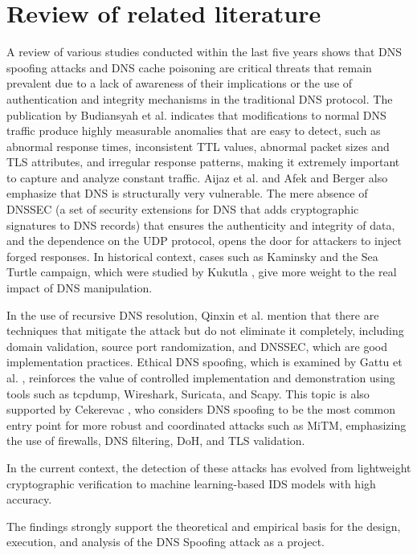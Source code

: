 \documentclass[conference]{IEEEtran}
\begin{document}
\section{Review of related literature}
A review of various studies conducted within the last five years shows that DNS spoofing attacks and DNS cache poisoning are critical threats that remain prevalent due to a lack of awareness of their implications or the use of authentication and integrity mechanisms in the traditional DNS protocol. The publication by Budiansyah et al. \cite{b1} indicates that modifications to normal DNS traffic produce highly measurable anomalies that are easy to detect, such as abnormal response times, inconsistent TTL values, abnormal packet sizes and TLS attributes, and irregular response patterns, making it extremely important to capture and analyze constant traffic. Aijaz et al. \cite{b2} and Afek and Berger \cite{b3} also emphasize that DNS is structurally very vulnerable. The mere absence of DNSSEC (a set of security extensions for DNS that adds cryptographic signatures to DNS records) that ensures the authenticity and integrity of data, and the dependence on the UDP protocol, opens the door for attackers to inject forged responses. In historical context, cases such as Kaminsky and the Sea Turtle campaign, which were studied by Kukutla \cite{b4}, give more weight to the real impact of DNS manipulation.

In the use of recursive DNS resolution, Qinxin et al. \cite{b5} mention that there are techniques that mitigate the attack but do not eliminate it completely, including domain validation, source port randomization, and DNSSEC, which are good implementation practices. Ethical DNS spoofing, which is examined by Gattu et al. \cite{b6}, reinforces the value of controlled implementation and demonstration using tools such as tcpdump, Wireshark, Suricata, and Scapy. This topic is also supported by Cekerevac \cite{b7}, who considers DNS spoofing to be the most common entry point for more robust and coordinated attacks such as MiTM, emphasizing the use of firewalls, DNS filtering, DoH, and TLS validation.

In the current context, the detection of these attacks has evolved from lightweight cryptographic verification \cite{b8} to machine learning-based IDS models with high accuracy. \cite{b9}

The findings strongly support the theoretical and empirical basis for the design, execution, and analysis of the DNS Spoofing attack as a project.
\end{document}
